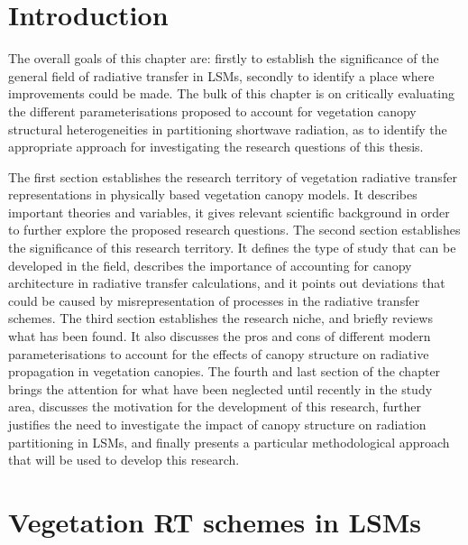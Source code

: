 
\section{Introduction}\label{introduction}
The overall goals of this chapter are: firstly to establish the significance of the general field of radiative transfer in LSMs, secondly to identify a place where improvements could be made. The bulk of this chapter is on critically evaluating the different parameterisations proposed to account for vegetation canopy structural heterogeneities in partitioning shortwave radiation, as to identify the appropriate approach for investigating the research questions of this thesis. 

The first section establishes the research territory of vegetation radiative transfer representations in physically based vegetation canopy models. It describes important theories and variables, it gives relevant scientific background in order to further explore the proposed research questions. 
The second section establishes the significance of this research territory. It defines the type of study that can be developed in the field, describes the importance of accounting for canopy architecture in radiative transfer calculations, and it points out deviations that could be caused by misrepresentation of processes in the radiative transfer schemes.
The third section establishes the research niche, and briefly reviews what has been found. It also discusses the pros and cons of different modern parameterisations to account for the effects of canopy structure on radiative propagation in vegetation canopies.
The fourth and last section of the chapter brings the attention for what have been neglected until recently in the study area, discusses the motivation for the development of this research, further justifies the need to investigate the impact of canopy structure on radiation partitioning in LSMs, and finally presents a particular methodological approach that will be used to develop this research.

\section{Vegetation RT schemes in LSMs}\label{sec:rt_in_lsms}


